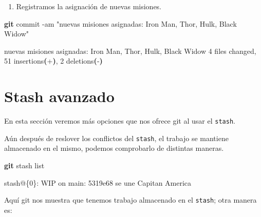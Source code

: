\documentclass[
]{book}
\newenvironment{Shaded}{\begin{snugshade}}{\end{snugshade}}
\newcommand{\AttributeTok}[1]{\textcolor[rgb]{0.13,0.29,0.53}{#1}}
\newcommand{\ErrorTok}[1]{\textcolor[rgb]{0.64,0.00,0.00}{\textbf{#1}}}
\newcommand{\ExtensionTok}[1]{#1}
\newcommand{\FunctionTok}[1]{\textcolor[rgb]{0.13,0.29,0.53}{\textbf{#1}}}
\newcommand{\KeywordTok}[1]{\textcolor[rgb]{0.13,0.29,0.53}{\textbf{#1}}}
\newcommand{\NormalTok}[1]{#1}
\newcommand{\StringTok}[1]{\textcolor[rgb]{0.31,0.60,0.02}{#1}}
\providecommand{\tightlist}{%
  \setlength{\itemsep}{0pt}\setlength{\parskip}{0pt}}
\begin{document}
\begin{enumerate}
\def\labelenumi{\arabic{enumi}.}
\setcounter{enumi}{10}
\tightlist
\item
  Registramos la asignación de nuevas misiones.
\end{enumerate}

\begin{Shaded}
\begin{Highlighting}[]
\FunctionTok{git}\NormalTok{ commit }\AttributeTok{{-}am} \StringTok{"nuevas misiones asignadas: Iron Man, Thor, Hulk, Black Widow"}
\end{Highlighting}
\end{Shaded}

\begin{Shaded}
\begin{Highlighting}[]
\ExtensionTok{[main}\NormalTok{ 1db9966] nuevas misiones asignadas: Iron Man, Thor, Hulk, Black Widow}
 \ExtensionTok{4}\NormalTok{ files changed, 51 insertions}\ErrorTok{(}\ExtensionTok{+}\KeywordTok{)}\ExtensionTok{,}\NormalTok{ 2 deletions}\ErrorTok{(}\ExtensionTok{{-}}\KeywordTok{)}
\end{Highlighting}
\end{Shaded}

\section{Stash avanzado}\label{stash-avanzado}

En esta sección veremos más opciones que nos ofrece git al usar el \texttt{stash}.

Aún después de reslover los conflictos del \texttt{stash}, el trabajo se mantiene almacenado en el mismo, podemos comprobarlo de distintas maneras.

\begin{Shaded}
\begin{Highlighting}[]
\FunctionTok{git}\NormalTok{ stash list}
\end{Highlighting}
\end{Shaded}

\begin{Shaded}
\begin{Highlighting}[]
\ExtensionTok{stash@\{0\}:}\NormalTok{ WIP on main: 5319e68 se une Capitan America}
\end{Highlighting}
\end{Shaded}

Aquí git nos muestra que tenemos trabajo almacenado en el \texttt{stash}; otra manera es:
\end{document}
